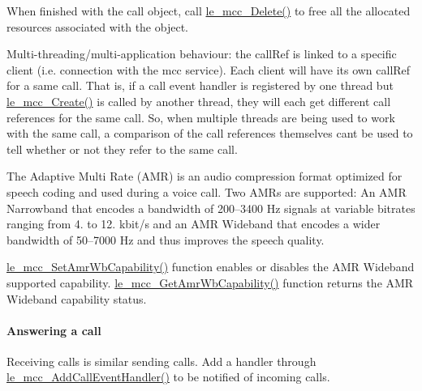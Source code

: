 When finished with the call object, call \hyperlink{le__mcc__interface_8h_a1a016e6443df2d3ee99113649f4f34ae}{le\+\_\+mcc\+\_\+\+Delete()} to free all the allocated resources associated with the object.

Multi-\/threading/multi-\/application behaviour\+: the call\+Ref is linked to a specific client (i.\+e. connection with the mcc service). Each client will have its own call\+Ref for a same call. That is, if a call event handler is registered by one thread but \hyperlink{le__mcc__interface_8h_a42130fc6b1d69413a387e3292117b3d3}{le\+\_\+mcc\+\_\+\+Create()} is called by another thread, they will each get different call references for the same call. So, when multiple threads are being used to work with the same call, a comparison of the call references themselves can\textquotesingle{}t be used to tell whether or not they refer to the same call.

The Adaptive Multi Rate (A\+MR) is an audio compression format optimized for speech coding and used during a voice call. Two A\+M\+Rs are supported\+: An A\+MR Narrowband that encodes a bandwidth of 200–3400 Hz signals at variable bitrates ranging from 4. to 12. kbit/s and an A\+MR Wideband that encodes a wider bandwidth of 50–7000 Hz and thus improves the speech quality.

\hyperlink{le__mcc__interface_8h_ab2df0040963d964f360cb2b7148f9277}{le\+\_\+mcc\+\_\+\+Set\+Amr\+Wb\+Capability()} function enables or disables the A\+MR Wideband supported capability. \hyperlink{le__mcc__interface_8h_a3762311b9860dc66c52b00f4324dc140}{le\+\_\+mcc\+\_\+\+Get\+Amr\+Wb\+Capability()} function returns the A\+MR Wideband capability status.\hypertarget{c_mcc_le_mcc_answering_a_call}{}\paragraph{Answering a call}\label{c_mcc_le_mcc_answering_a_call}
Receiving calls is similar sending calls. Add a handler through \hyperlink{le__mcc__interface_8h_ab826cf4b9e3911e659a90d483081e7fe}{le\+\_\+mcc\+\_\+\+Add\+Call\+Event\+Handler()} to be notified of incoming calls.

